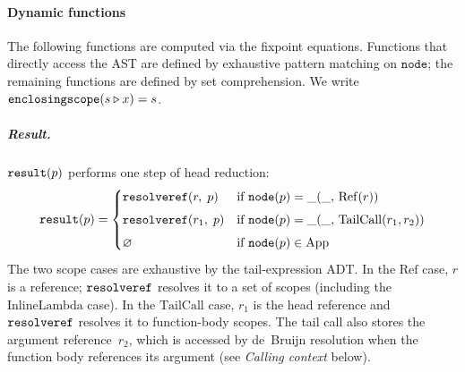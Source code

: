\paragraph{Dynamic functions}
The following functions are computed via the fixpoint
equations.
Functions that directly access the AST are defined by
exhaustive pattern matching on $\mathtt{node}$;
the remaining functions are defined by set comprehension.
We write $\mathtt{enclosingscope}(s \mathbin{\triangleright} x) = s$.

\subparagraph{Result.}
$\mathtt{result}(p)$ performs one step of head reduction:
\begin{equation}\label{eq:lambda-result}
  \mathtt{result}(p) =
  \begin{cases}
    \mathtt{resolveref}(r,\; p)
    & \text{if } \mathtt{node}(p) = \_(\_,\, \mathrm{Ref}(r)) \\[4pt]
    \mathtt{resolveref}(r_1,\; p)
    & \text{if } \mathtt{node}(p) = \_(\_,\, \mathrm{TailCall}(r_1, r_2)) \\[4pt]
    \varnothing
    & \text{if } \mathtt{node}(p) \in \mathrm{App}
  \end{cases}
\end{equation}
The two scope cases are exhaustive by the tail-expression
ADT\@.
In the $\mathrm{Ref}$ case, $r$ is a reference;
$\mathtt{resolveref}$ resolves it to a set of scopes
(including the $\mathrm{InlineLambda}$ case).
In the $\mathrm{TailCall}$ case,
$r_1$ is the head reference
and $\mathtt{resolveref}$ resolves it to function-body scopes.
The tail call also stores the argument reference~$r_2$,
which is accessed by de~Bruijn resolution when the function
body references its argument (see \emph{Calling context} below).


